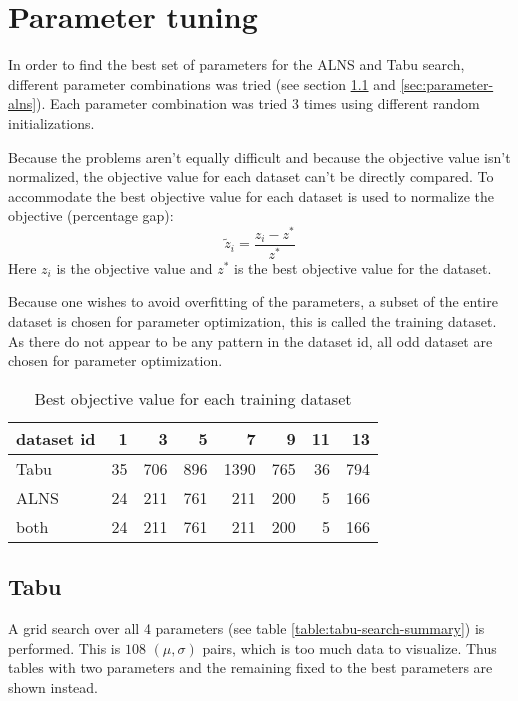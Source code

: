 \section{Parameter tuning}
\label{sec:parameter-tuning}

In order to find the best set of parameters for the ALNS and Tabu search, different parameter combinations was tried (see section \ref{sec:parameter-tabu} and \ref{sec:parameter-alns}). Each parameter combination was tried 3 times using different random initializations.

Because the problems aren't equally difficult and because the objective value isn't normalized, the objective value for each dataset can't be directly compared. To accommodate the best objective value for each dataset is used to normalize the objective (percentage gap):
\begin{equation}
\tilde{z}_i = \frac{z_i - z^*}{z^*}
\end{equation}
Here $z_i$ is the objective value and $z^*$ is the best objective value for the dataset.

Because one wishes to avoid overfitting of the parameters, a subset of the entire dataset is chosen for parameter optimization, this is called the training dataset. As there do not appear to be any pattern in the dataset id, all odd dataset are chosen for parameter optimization.

\begin{table}[H]
\centering
\begin{tabular}{l|rrrrrrr}
 dataset id &   1 &   3 &   5 &    7 &   9 &   11 &   13 \\
\hline
 Tabu   &  35 & 706 & 896 & 1390 & 765 &   36 &  794 \\
 ALNS   &  24 & 211 & 761 &  211 & 200 &    5 &  166 \\
 both   &  24 & 211 & 761 &  211 & 200 &    5 &  166 \\
\end{tabular}
\caption{Best objective value for each training dataset}
\end{table}

\subsection{Tabu}
\label{sec:parameter-tabu}

A grid search over all 4 parameters (see table \ref{table:tabu-search-summary}) is performed. This is $108$ $(\mu, \sigma)$ pairs, which is too much data to visualize. Thus tables with two parameters and the remaining fixed to the best parameters are shown instead.

